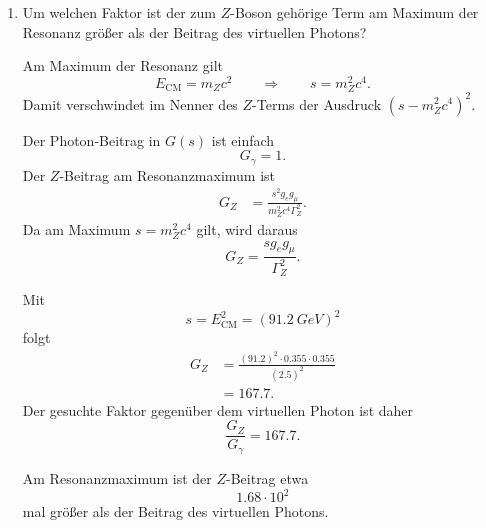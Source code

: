 \documentclass[11pt,a4paper]{scrartcl}
\begin{document}
    \begin{enumerate}[label=(\alph*)]
        \item
            Um welchen Faktor ist der zum $Z$-Boson gehörige Term am Maximum der Resonanz
            größer als der Beitrag des virtuellen Photons?

            \begin{calculationbox}
                Am Maximum der Resonanz gilt
                \[
                    E_{\mathrm{CM}}=m_Zc^2
                    \qquad\Longrightarrow\qquad
                    s=m_Z^2c^4.
                \]
                Damit verschwindet im Nenner des $Z$-Terms der Ausdruck
                $(s-m_Z^2c^4)^2$.

                \begin{calculationbox}
                    Der Photon-Beitrag in $G(s)$ ist einfach
                    \[
                        G_\gamma=1.
                    \]
                    Der $Z$-Beitrag am Resonanzmaximum ist
                    \begin{align*}
                        G_Z
                        &=\frac{s^2g_eg_\mu}{m_Z^2c^4\Gamma_Z^2}.
                    \end{align*}
                    Da am Maximum $s=m_Z^2c^4$ gilt, wird daraus
                    \[
                        G_Z=\frac{s g_eg_\mu}{\Gamma_Z^2}.
                    \]
                \end{calculationbox}

                \begin{calculationbox}
                    Mit
                    \[
                        s=E_{\mathrm{CM}}^2=(\SI{91.2}{GeV})^2
                    \]
                    folgt
                    \begin{align*}
                        G_Z
                        &=\frac{(91.2)^2\cdot 0.355\cdot 0.355}{(2.5)^2}\\
                        &=167.7.
                    \end{align*}
                    Der gesuchte Faktor gegenüber dem virtuellen Photon ist daher
                    \[
                        \frac{G_Z}{G_\gamma}=167.7.
                    \]
                \end{calculationbox}
            \end{calculationbox}

            \begin{answerbox}
                Am Resonanzmaximum ist der $Z$-Beitrag etwa
                \[
                    \boxed{1.68\cdot 10^2}
                \]
                mal größer als der Beitrag des virtuellen Photons.
            \end{answerbox}


\end{enumerate}
\end{document}
